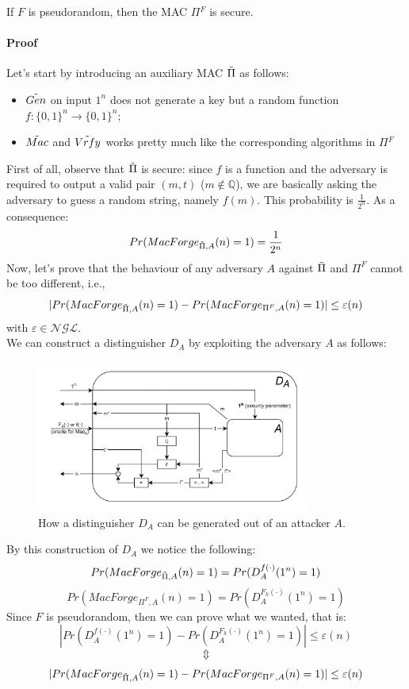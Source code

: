 \documentclass[../main]{subfiles}
\begin{document}
\begin{theorem}
    If $F$ is pseudorandom, then the MAC $\Pi{}^F$ is secure.
\end{theorem}

\paragraph{Proof}
Let's start by introducing an auxiliary MAC $\Tilde{\Pi}$ as follows:
\begin{itemize}
    \item $\Tilde{Gen}$ on input $1^n$ does not generate a key but a random function $f: \{0,1\}^n \rightarrow{} \{0,1\}^n$;
    \item $\Tilde{Mac}$ and $\Tilde{Vrfy}$ works pretty much like the corresponding algorithms in $\Pi{}^F$
\end{itemize}
First of all, observe that $\Tilde{\Pi}$ is secure: since $f$ is a function and the adversary is required to output a valid pair $(m,t)$ ($m \notin{} \mathbb{Q}$),
we are basically asking the adversary to guess a random string, namely $f(m)$. This probability is $\frac{1}{2^n}$.
As a consequence:
$$Pr(MacForge_{\Tilde{\Pi},A}(n) = 1) = \frac{1}{2^n}$$
Now, let's prove that the behaviour of any adversary $A$ against $\Tilde{\Pi}$ and $\Pi^F$ cannot be too different, i.e.,
$$|Pr(MacForge_{\Tilde{\Pi},A}(n) = 1) - Pr(MacForge_{\Pi^F,A}(n) = 1)| \le{} \varepsilon(n)$$
with $\varepsilon \in{} \mathcal{NGL}$.\\
We can construct a distinguisher $D_A$ by exploiting the adversary $A$ as follows:
\begin{figure}[H]
    \centering
    \includegraphics[width=0.8\textwidth]{images/security_of_mac_given_pseudorandom_F}
    \caption{How a distinguisher $D_A$ can be generated out of an attacker $A$.}
\end{figure}

\noindent
By this construction of $D_A$ we notice the following:
$$Pr(MacForge_{\Tilde{\Pi},A}(n) = 1) = Pr(D_A^{f(\cdot)}(1^n) = 1)$$
$$Pr(MacForge_{\Pi^F,A}(n) = 1) = Pr(D_A^{F_k(\cdot)}(1^n) = 1)$$
Since $F$ is pseudorandom, then we can prove what we wanted, that is:
$$|Pr(D_A^{f(\cdot)}(1^n) = 1) - Pr(D_A^{F_k(\cdot)}(1^n) = 1)| \le{} \varepsilon(n)$$
$$\Updownarrow$$
$$|Pr(MacForge_{\Tilde{\Pi},A}(n) = 1) - Pr(MacForge_{\Pi^F,A}(n) = 1)| \le{} \varepsilon(n)$$
\end{document}
